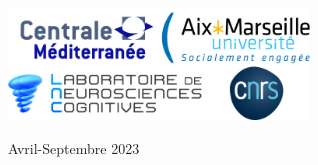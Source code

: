 \documentclass[12pt]{report}
\begin{document}
\begin{titlepage}
	
	
	
	
	
	\vfill\vfill
	\includegraphics[width=0.6\textwidth]{logos.png}\\[1cm] %
	 
	\vfill\vfill\vfill %
	
	{\large Avril-Septembre 2023} %
	
	\vfill %
	
\end{titlepage}




\tableofcontents












\renewcommand{\appendixpagename}{Annexes}
\appendix
\appendixpage
\addappheadtotoc


\end{document}
